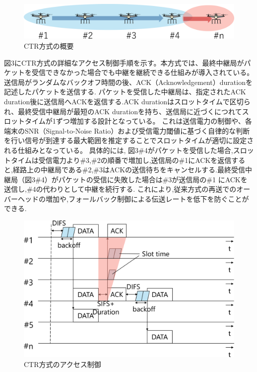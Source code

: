 \documentclass[a4paper,10.5pt]{ltjsarticle}  %
\begin{document}
\begin{figure}[H]
  \centering
  \includegraphics[width=\linewidth]{CTR_topology.pdf} %
  \caption{CTR方式の概要}
  \label{fig:CTR方式のトポロジー} %
\end{figure}

図3にCTR方式の詳細なアクセス制御手順を示す。本方式では、最終中継局がパケットを受信できなかった場合でも中継を継続できる仕組みが導入されている。送信局がランダムなバックオフ時間の後、ACK（Acknowledgement）durationを記述したパケットを送信する.
パケットを受信した中継局は、指定されたACK duration後に送信局へACKを返信する.ACK durationはスロットタイムで区切られ、最終受信中継局が最短のACK durationを持ち、送信局に近づくにつれてスロットタイムが1ずつ増加する設計となっている。
これは送信電力の制御や、各端末のSNR（Signal-to-Noise Ratio）および受信電力閾値に基づく自律的な判断を行い信号が到達する最大範囲を推定することでスロットタイムが適切に設定される仕組みとなっている。
具体的には, 図3\#4がパケットを受信した場合,スロットタイムは受信電力より\#3,\#2の順番で増加し,送信局の\#1にACKを返信すると,経路上の中継局である\#2,\#3はACKの送信待ちをキャンセルする.最終受信中継局（図3\#4）がパケットの受信に失敗した場合は\#3が送信局の\#1 にACKを送信し,\#4の代わりとして中継を続行する.
これにより,従来方式の再送でのオーバーヘッドの増加や,フォールバック制御による伝送レートを低下を防ぐことができる.

\begin{figure}[H]
  \centering
  \includegraphics[width=\linewidth]{CTR_accsess.pdf} %
  \caption{CTR方式のアクセス制御}
  \label{fig:CTR方式のアクセス制御} %
\end{figure}
\end{document}
